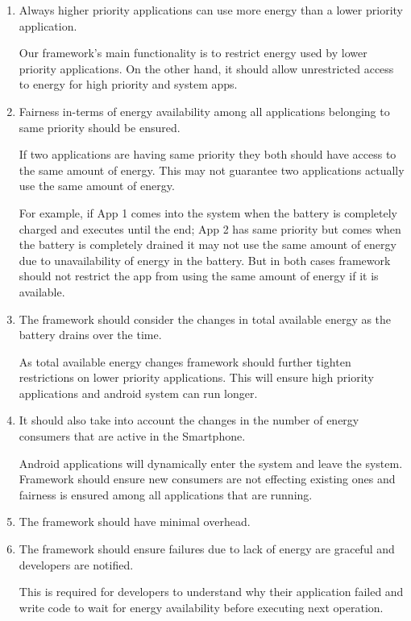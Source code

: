 \begin{enumerate}
\item Always higher priority applications can use more energy than a lower priority application.

Our framework's main functionality is to restrict energy used by lower priority applications. On the other hand, it should allow unrestricted access to energy for high priority and system apps.

\item Fairness in-terms of energy availability among all applications belonging to same priority should be ensured.

If two applications are having same priority they both should have access to the same amount of energy. This may not guarantee two applications actually use the same amount of energy. 

For example, if App 1 comes into the system when the battery is completely charged and executes until the end;  App 2 has same priority but comes when the battery is completely drained it may not use the same amount of energy due to unavailability of energy in the battery. But in both cases framework should not restrict the app from using the same amount of energy if it is available.

\item The framework should consider the changes in total available energy as the battery drains over the time.

As total available energy changes framework should further tighten restrictions on lower priority applications. This will ensure high priority applications and android system can run longer. 

\item It should also take into account the changes in the number of energy consumers that are active in the Smartphone. 

Android applications will dynamically enter the system and leave the system. Framework should ensure new consumers are not effecting existing ones and fairness is ensured among all applications that are running.

\item The framework should have minimal overhead.
\item The framework should ensure failures due to lack of energy are graceful and developers are notified.

This is required for developers to understand why their application failed and write code to wait for energy availability before executing next operation.


\end{enumerate}
